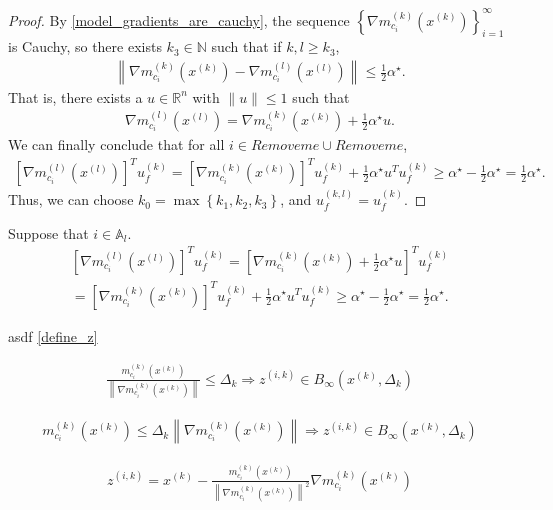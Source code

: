 \documentclass{article}
\theoremstyle{case}
\numberwithin{theorem}{subsection}
\newcommand{\activeconstraintsk}{{\mathbb A_{k}}}
\newcommand{\activeconstraintsl}{{\mathbb A_{l}}}
\newcommand{\dk}{\Delta_k}
\newcommand{\gmcik}{{\nabla m_{c_i}^{(k)}\left(\xk\right)}}
\newcommand{\gmcil}{{\nabla m_{c_i}^{(l)}\left(\xl\right)}}
\newcommand{\mcik}{{{m}^{(k)}_{c_i}}}
\newcommand{\mcil}{{{m}^{(l)}_{c_i}}}
\newcommand{\minanglealpha}{{ \alpha^{\star} }}
\newcommand{\naturals}{\mathbb N}
\newcommand{\Rn}{\mathbb R^n}
\newcommand{\tr}{{ B_{\infty}\left(\xk, \dk\right) }}
\newcommand{\xk}{x^{(k)}}
\newcommand{\xl}{{x^{(l)}}}
\newcommand{\zik}{{z^{(i, k)}}}
\newcommand{\minangledirk}{{u^{(k)}_f}}
\newcommand{\activeprojk}{{Remove me}}
\newcommand{\activeprojl}{{Remove me}}
\begin{document}
\begin{proof}
By \cref{model_gradients_are_cauchy}, the sequence $\left\{\gmcik\right\}_{i=1}^{\infty}$ is Cauchy,
so there exists $k_3 \in \naturals$ such that if $k, l \ge k_3$,
\begin{align*}
\left\|\nabla \mcik\left(\xk\right) - \nabla \mcil\left(\xl\right) \right\| \le \frac 1 2 \minanglealpha.
\end{align*}
That is, there exists a $u \in \Rn$ with $\|u\| \le 1$ such that 
\begin{align*}
\gmcil = \gmcik + \frac 1 2 \minanglealpha u.
\end{align*}
We can finally conclude that for all $i \in \activeprojk \cup \activeprojl$,
\begin{align*}
\left[\gmcil \right]^T \minangledirk
= \left[\gmcik\right]^T \minangledirk + \frac 1 2 \minanglealpha u^T \minangledirk
\ge \minanglealpha - \frac 1 2 \minanglealpha = \frac 1 2 \minanglealpha.
\end{align*}
Thus, we can choose $k_0 = \max\left\{k_1, k_2, k_3\right\}$, and $u_f^{(k,l)} = \minangledirk$.
\end{proof}

\color{red}



Suppose that $i \in \activeconstraintsl$.
\begin{align*}
\left[\gmcil \right]^T \minangledirk = \left[\gmcik + \frac 1 2 \minanglealpha u \right]^T \minangledirk \\
= \left[\gmcik\right]^T \minangledirk + \frac 1 2 \minanglealpha u^T \minangledirk
\ge \minanglealpha - \frac 1 2 \minanglealpha = \frac 1 2 \minanglealpha.
\end{align*}



asdf
\cref{define_z}



\begin{align*}
\frac{m^{(k)}_{c_i}(\xk)}{\left\|\gmcik\right\|} \le \dk
\Longrightarrow \zik \in \tr
\end{align*}

\begin{align*}
m^{(k)}_{c_i}(\xk) \le \dk \left\|\gmcik\right\|
\Longrightarrow \zik \in \tr
\end{align*}


\begin{align*}
\zik = \xk - \frac{m^{(k)}_{c_i}(\xk)}{\left\|\gmcik\right\|^2} \gmcik
\end{align*}
\end{document}
